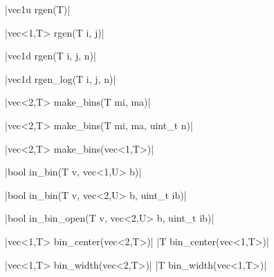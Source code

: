 \funcitem \cppinline|vec1u rgen(T)| 

\cppinline|vec<1,T> rgen(T i, j)|

\cppinline|vec1d rgen(T i, j, n)|

\cppinline|vec1d rgen_log(T i, j, n)| 

\funcitem \cppinline|vec<2,T> make_bins(T mi, ma)| 

\cppinline|vec<2,T> make_bins(T mi, ma, uint_t n)|

\cppinline|vec<2,T> make_bins(vec<1,T>)|

\funcitem \vectorfunc \cppinline|bool in_bin(T v, vec<1,U> b)| 

\vectorfunc \cppinline|bool in_bin(T v, vec<2,U> b, uint_t ib)|

\vectorfunc \cppinline|bool in_bin_open(T v, vec<2,U> b, uint_t ib)| 

\funcitem \cppinline|vec<1,T> bin_center(vec<2,T>)| 
\cppinline|T bin_center(vec<1,T>)|

\funcitem \cppinline|vec<1,T> bin_width(vec<2,T>)| 
\cppinline|T bin_width(vec<1,T>)|

